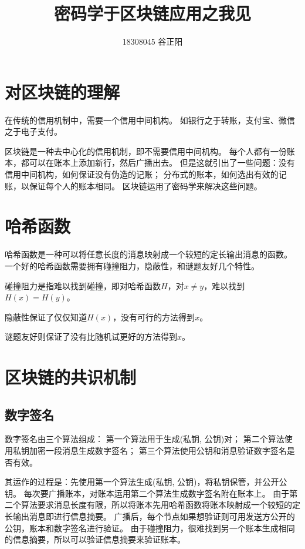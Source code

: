 \documentclass[UTF8,12pt]{article}
\title{密码学于区块链应用之我见}
\date{}
\author{18308045 谷正阳}
\begin{document}
    \maketitle
    \section{对区块链的理解}
    在传统的信用机制中，需要一个信用中间机构。
    如银行之于转账，支付宝、微信之于电子支付。

    区块链是一种去中心化的信用机制，即不需要信用中间机构。
    每个人都有一份账本，都可以在账本上添加新行，然后广播出去。
    但是这就引出了一些问题：没有信用中间机构，如何保证没有伪造的记账；
    分布式的账本，如何选出有效的记账，以保证每个人的账本相同。
    区块链运用了密码学来解决这些问题。

    \section{哈希函数}
    哈希函数是一种可以将任意长度的消息映射成一个较短的定长输出消息的函数。
    一个好的哈希函数需要拥有碰撞阻力，隐蔽性，和谜题友好几个特性。

    碰撞阻力是指难以找到碰撞，即对哈希函数$H$，对$x\neq y$，难以找到$H(x)=H(y)$。

    隐蔽性保证了仅仅知道$H(x)$，没有可行的方法得到$x$。

    谜题友好则保证了没有比随机试更好的方法得到$x$。

    \section{区块链的共识机制}
        \subsection{数字签名}
        数字签名由三个算法组成：
        第一个算法用于生成(私钥, 公钥)对；
        第二个算法使用私钥加密一段消息生成数字签名；
        第三个算法使用公钥和消息验证数字签名是否有效。

        其运作的过程是：先使用第一个算法生成(私钥, 公钥)，将私钥保管，并公开公钥。
        每次要广播账本，对账本运用第二个算法生成数字签名附在账本上。
        由于第二个算法要求消息长度有限，所以将账本先用哈希函数将账本映射成一个较短的定长输出消息即进行信息摘要。
        广播后，每个节点如果想验证则可用发送方公开的公钥，账本和数字签名进行验证。
        由于碰撞阻力，很难找到另一个账本生成相同的信息摘要，所以可以验证信息摘要来验证账本。
\end{document}
